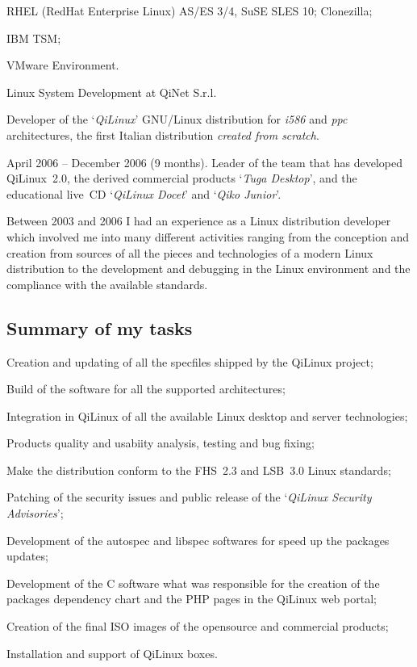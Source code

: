 \item{\bdot} RHEL (RedHat Enterprise Linux) AS/ES 3/4, SuSE SLES 10; Clonezilla;
\item{\bdot} IBM TSM;
\item{\bdot} VMware Environment.
 

\bigskip
{}
   {Linux System Development at QiNet S.r.l.}

\noindent
Developer of the `{\it QiLinux\/}' GNU/Linux distribution for {\it i586} and
{\it ppc} architectures, the first Italian distribution
{\it created from scratch}.

\noindent
April 2006 -- December 2006 (9 months). 
Leader of the team that has developed QiLinux~2.0, the derived commercial 
products `{\it Tuga Desktop\/}', and the educational live~CD 
`{\it QiLinux Docet\/}' and `{\it Qiko Junior\/}'.

Between 2003 and 2006 I had an experience as a Linux distribution developer 
which involved me into many different activities ranging from the conception
and creation from sources of all the pieces and technologies of a modern Linux
distribution to the development and debugging in the Linux environment and 
the compliance with the available standards.

\subsection{Summary of my tasks}

\item{\bdot} Creation and updating of all the specfiles shipped by the QiLinux project;
\item{\bdot} Build of the software for all the supported architectures;
\item{\bdot} Integration in QiLinux of all the available Linux desktop and server technologies;
\item{\bdot} Products quality and usabiity analysis, testing and bug fixing;
\item{\bdot} Make the distribution conform to the FHS~2.3 and LSB~3.0 Linux standards;
\item{\bdot} Patching of the security issues and public release of the 
   `{\it QiLinux Security Advisories\/}';
\item{\bdot} Development of the autospec and libspec softwares for speed up the packages updates;
\item{\bdot} Development of the C software what was responsible for the creation
   of the packages dependency chart and the PHP pages in the QiLinux web portal;
\item{\bdot} Creation of the final ISO images of the opensource and commercial products;
\item{\bdot} Installation and support of QiLinux boxes.

